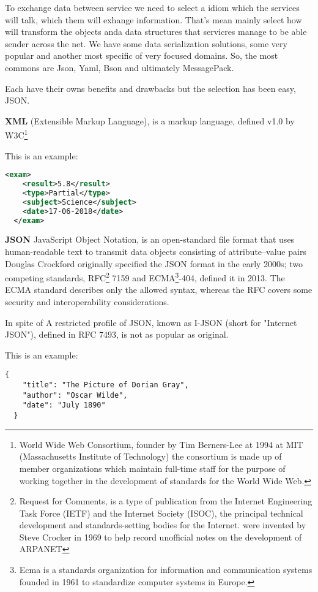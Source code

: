 To exchange data between service we need to select a idiom which the services
will talk, which them will exhange information. That's mean mainly select how
will transform the objects anda data structures that servicres manage to be able
sender across the net.
We have some data serialization solutions, some very popular and another most
specific of very focused domains. So, the most commons are Json, Yaml,
Bson and ultimately MessagePack.

Each have their owns benefits and drawbacks but the selection has been easy, JSON.

\textbf{XML} (Extensible Markup Language), is a markup language, defined v1.0 by
W3C\footnote{World Wide Web Consortium, founder by Tim Berners-Lee at 1994 at MIT
(Massachusetts Institute of Technology) the consortium is made up of member
organizations which maintain full-time staff for the purpose of working together
in the development of standards for the World Wide Web.}

This is an example:
\begin{lstlisting}[language=xml,frame=none,numbers=none]
  <exam>
    <result>5.8</result>
    <type>Partial</type>
    <subject>Science</subject>
    <date>17-06-2018</date>
  </exam>
\end{lstlisting}

\textbf{JSON} JavaScript Object Notation, is an open-standard file format that uses
human-readable text to transmit data objects consisting of attribute–value pairs
Douglas Crockford originally specified the JSON format in the early 2000s;
two competing standards, RFC\footnote{ Request for Comments, is a type of
publication from the Internet Engineering Task Force (IETF) and the Internet
Society (ISOC), the principal technical development and standards-setting bodies
for the Internet. were invented by Steve Crocker in 1969 to help record
unofficial notes on the development of ARPANET} 7159 and ECMA\footnote{Ecma is a
standards organization for information and communication systems founded in 1961
to standardize computer systems in Europe.}-404, defined it in 2013.
The ECMA standard describes only the allowed syntax, whereas the RFC covers some
 security and interoperability considerations.

In spite of A restricted profile of JSON, known as I-JSON (short for "Internet JSON"),
defined in RFC 7493, is not as popular as original.

This is an example:
\begin{lstlisting}[frame=none,numbers=none]
  {
    "title": "The Picture of Dorian Gray",
    "author": "Oscar Wilde",
    "date": "July 1890"
  }
\end{lstlisting}


